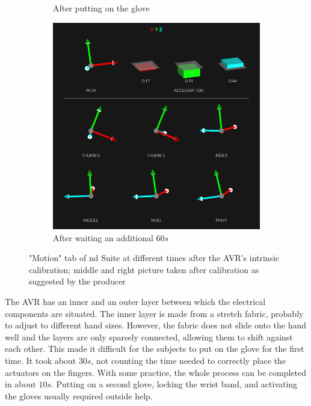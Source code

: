 \documentclass[hyperref, bachelorofscience]{cgvpub}
\begin{document}
\begin{figure}
\begin{subfigure}{.3\linewidth}
		\caption{After putting on the glove}
		\label{fig:glove_cal:puton}
	\end{subfigure}
	\hfill
	\begin{subfigure}{.3\linewidth}
		\includegraphics[width=\linewidth]{../pics/glove_cal3}
		\caption{After waiting an additional $ 60s $}
		\label{fig:glove_cal:minute}
	\end{subfigure}
	\caption{"Motion" tab of \acrshort{nd} Suite at different times after the \Gls{AVR}'s intrinsic calibration; middle and right picture taken after calibration as suggested by the producer}
	\label{fig:glove_cal}
\end{figure}

The \Gls{AVR} has an inner and an outer layer between which the electrical components are situated. The inner layer is made from a stretch fabric, probably to adjust to different hand sizes. However, the fabric does not slide onto the hand well and the layers are only sparsely connected, allowing them to shift against each other. This made it difficult for the subjects to put on the glove for the first time. It took about $ 30s $, not counting the time needed to correctly place the actuators on the fingers. With some practice, the whole process can be completed in about $ 10s $. Putting on a second glove, locking the wrist band, and activating the gloves usually required outside help. 
\end{document}

